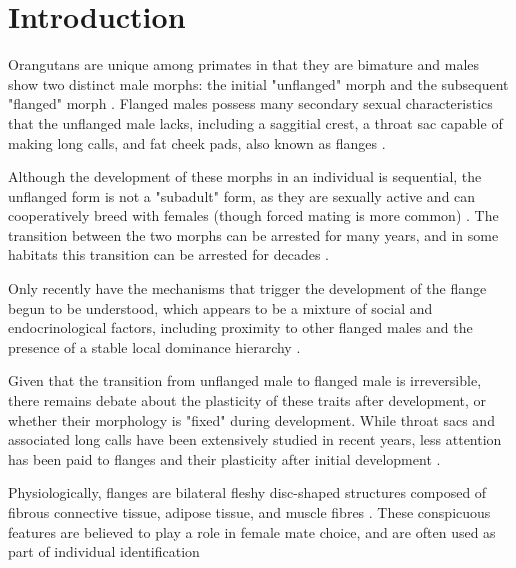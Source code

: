 \ifpdf
    \graphicspath{{Chapter1/Figs/Raster/}{Chapter1/Figs/PDF/}{Chapter1/Figs/}}
\else
    \graphicspath{{Chapter1/Figs/Vector/}{Chapter1/Figs/}}
\fi
\chapter{Introduction}  %

Orangutans are unique among primates in that they are bimature and males show two distinct male morphs: the initial "unflanged" morph and the subsequent "flanged" morph \citep{Knott.2008}. Flanged males possess many secondary sexual characteristics that the unflanged male lacks, including a saggitial crest, a throat sac capable of making long calls, and fat cheek pads, also known as flanges \citep{Galdikas.1978cv}.

Although the development of these morphs in an individual is sequential, the unflanged form is not a "subadult" form, as they are sexually active and can cooperatively breed with females (though forced mating is more common) \citep{Knott.2009, Kunz.2023}. The transition between the two morphs can be arrested for many years, and in some habitats this transition can be arrested for decades \citep{Dunkel.2013}. 

Only recently have the mechanisms that trigger the development of the flange begun to be understood, which appears to be a mixture of social and endocrinological factors, including proximity to other flanged males and the presence of a stable local dominance hierarchy \citep{Dunkel.2013xnm, Marty.2015, Prasetyo.2019}.

Given that the transition from unflanged male to flanged male is irreversible, there remains debate about the plasticity of these traits after development, or whether their morphology is "fixed" during development. While throat sacs and associated long calls have been extensively studied in recent years, less attention has been paid to flanges and their plasticity after initial development \citep{Spillmann.2016}.

Physiologically, flanges are bilateral fleshy disc-shaped structures composed of fibrous connective tissue, adipose tissue, and muscle fibres \citep{Straus.1942,Winkler.1989}. These conspicuous features are believed to play a role in female mate choice, and are often used as part of individual identification \citep{Utami.2002km8, Kappeler.2004}

